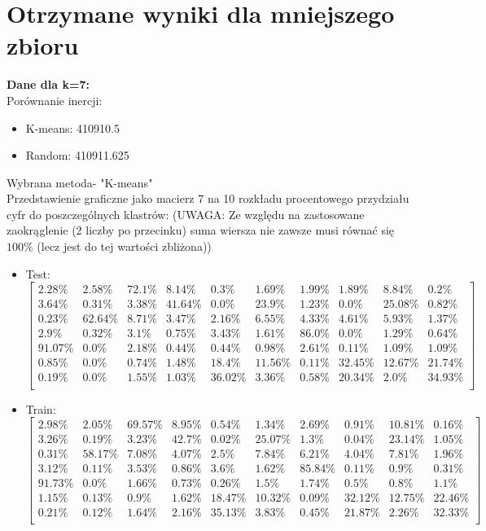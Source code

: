 \documentclass[a4paper,14pt]{report}
\begin{document}
\section{Otrzymane wyniki dla mniejszego zbioru}
	\textbf{Dane dla k=7: } \\
	Porównanie inercji: 
	\begin{itemize}
		\item K-means: 410910.5
		\item Random: 410911.625
	\end{itemize}
	Wybrana metoda- "K-means" \\
	Przedstawienie graficzne jako macierz 7 na 10 rozkładu procentowego przydziału cyfr do poszczególnych klastrów:
	(UWAGA: Ze względu na zastosowane zaokrąglenie (2 liczby po przecinku) suma wiersza nie zawsze musi równać się $100\%$ (lecz jest do tej wartości zbliżona))
	\begin{itemize}
		\item Test:
		$
		\begin{bmatrix}
		2.28\% & 2.58\% & 72.1\% & 8.14\% & 0.3\% & 1.69\% & 1.99\% & 1.89\% & 8.84\% & 0.2\% \\
		3.64\% & 0.31\% & 3.38\% & 41.64\% & 0.0\% & 23.9\% & 1.23\% & 0.0\% & 25.08\% & 0.82\% \\
		0.23\% & 62.64\% & 8.71\% & 3.47\% & 2.16\% & 6.55\% & 4.33\% & 4.61\% & 5.93\% & 1.37\% \\
		2.9\% & 0.32\% & 3.1\% & 0.75\% & 3.43\% & 1.61\% & 86.0\% & 0.0\% & 1.29\% & 0.64\% \\
		91.07\% & 0.0\% & 2.18\% & 0.44\% & 0.44\% & 0.98\% & 2.61\% & 0.11\% & 1.09\% & 1.09\% \\
		0.85\% & 0.0\% & 0.74\% & 1.48\% & 18.4\% & 11.56\% & 0.11\% & 32.45\% & 12.67\% & 21.74\% \\
		0.19\% & 0.0\% & 1.55\% & 1.03\% & 36.02\% & 3.36\% & 0.58\% & 20.34\% & 2.0\% & 34.93\% \\
		\end{bmatrix} 
		$
		\item Train:
		$
		\begin{bmatrix}
		2.98\% & 2.05\% & 69.57\% & 8.95\% & 0.54\% & 1.34\% & 2.69\% & 0.91\% & 10.81\% & 0.16\% \\
		3.26\% & 0.19\% & 3.23\% & 42.7\% & 0.02\% & 25.07\% & 1.3\% & 0.04\% & 23.14\% & 1.05\% \\
		0.31\% & 58.17\% & 7.08\% & 4.07\% & 2.5\% & 7.84\% & 6.21\% & 4.04\% & 7.81\% & 1.96\% \\
		3.12\% & 0.11\% & 3.53\% & 0.86\% & 3.6\% & 1.62\% & 85.84\% & 0.11\% & 0.9\% & 0.31\% \\
		91.73\% & 0.0\% & 1.66\% & 0.73\% & 0.26\% & 1.5\% & 1.74\% & 0.5\% & 0.8\% & 1.1\% \\
		1.15\% & 0.13\% & 0.9\% & 1.62\% & 18.47\% & 10.32\% & 0.09\% & 32.12\% & 12.75\% & 22.46\% \\
		0.21\% & 0.12\% & 1.64\% & 2.16\% & 35.13\% & 3.83\% & 0.45\% & 21.87\% & 2.26\% & 32.33\% \\
		\end{bmatrix} 
		$
	\end{itemize}
\end{document}

